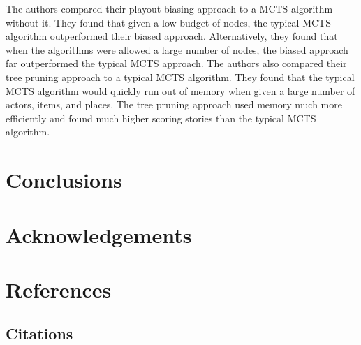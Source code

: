 \documentclass{sig-alternate}
\begin{document}
The authors compared their playout biasing approach to a MCTS algorithm without it. They found that given a low budget of nodes, the typical MCTS algorithm outperformed their biased approach. Alternatively, they found that when the algorithms were allowed a large number of nodes, the biased approach far outperformed the typical MCTS approach. The authors also compared their tree pruning approach to a typical MCTS algorithm. They found that the typical MCTS algorithm would quickly run out of memory when given a large number of actors, items, and places. The tree pruning approach used memory much more efficiently and found much higher scoring stories than the typical MCTS algorithm.

\section{Conclusions}

\section{Acknowledgements}

\section{References}

\subsection{Citations}


  
\end{document}
